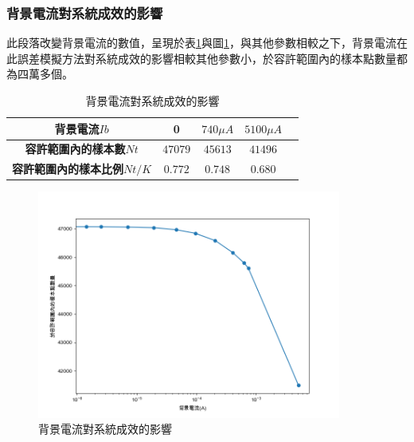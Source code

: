     \subsubsection{背景電流對系統成效的影響}
    \label{chp:backgroung_bandwidth}

    此段落改變背景電流的數值，呈現於表\ref{tab:background_effect}與圖\ref{pic:background_effect}，與其他參數相較之下，背景電流在此誤差模擬方法對系統成效的影響相較其他參數小，於容許範圍內的樣本點數量都為四萬多個。

    \begin{table}[htpb]
        \begin{center}
          \caption{背景電流對系統成效的影響}
          \label{tab:background_effect}
          \begin{tabular}{|c||c|c|c|c|} %
            \hline  
           \textbf{背景電流$Ib$} &
           0&
           $740\mu A$&
           $5100\mu A$
           \\\hline\hline

           \textbf{容許範圍內的樣本數$Nt$} &
           $47079$&
           $45613$&
           $41496$
           \\\hline

           \textbf{容許範圍內的樣本比例$Nt/K$} &
           $0.772$&
           $0.748$&
           $0.680$
           \\\hline
         \end{tabular}
       \end{center}
     \end{table}

     \begin{figure}[htpb]
        \centering
        \includegraphics[width=10cm]{ch4pic/background_effect.png}
        \caption{背景電流對系統成效的影響}
        \label{pic:background_effect}
    \end{figure}

